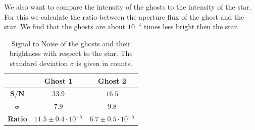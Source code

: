 We also want to compare the intensity of the ghosts to the intensity of the star. For this we calculate the ratio between the aperture flux of the ghost and the star. We find that the ghosts are about $10^{-4}$ times less bright then the star. 
\begin{table}[H] 
\centering
\begin{tabular}{|c|c|c|}
\hline
 & \textbf{Ghost 1} & \textbf{Ghost 2}\\
\hline
$\mathbf{S/N}$ & $33.9$ & $16.5$\\
\hline
$\mathbf{\sigma}$ & $7.9$ & $9.8$\\ 
\hline
\textbf{Ratio} & $11.5 \pm 0.4 \cdot 10^{-5}$ & $6.7 \pm 0.5 \cdot 10^{-5}$\\
\hline
\end{tabular}
\caption{Signal to Noise of the ghosts and their brightness with respect to the star. The standard deviation $\sigma$ is given in counts.}
\label{table:ghosts}
\end{table}
